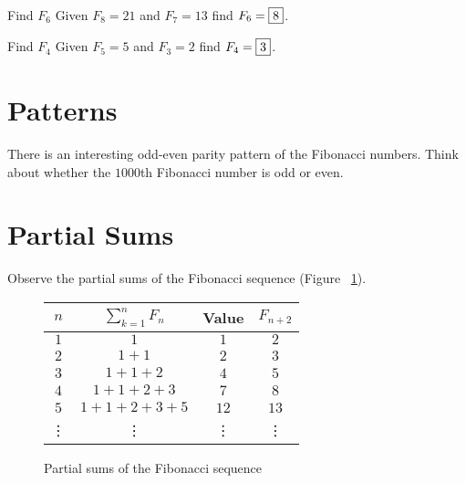 \documentclass[a4paper,10pt]{report}
\begin{document}
\begin{problem}{Find $F_6$}
 Given $F_8=21$ and $F_7=13$ find $F_6=\Ans{8}$.
\end{problem}

\begin{problem}{Find $F_4$}
 Given $F_5=5$ and $F_3=2$ find $F_4=\Ans{3}$.
\end{problem}

\section{Patterns}

There is an interesting odd-even parity pattern of the Fibonacci numbers. Think
about whether the $1000$th Fibonacci number is odd or even.

\section{Partial Sums}

Observe the partial sums of the Fibonacci sequence (Figure
~\ref{fib:partialsums}).

\begin{figure}
 \begin{tabular}{|c|c|c|c|}
  \hline
  $n$ & $\displaystyle \sum_{k=1}^n F_n$ & Value & $F_{n+2}$ \\
  \hline
  $1$ & $1$ & $1$ & $2$ \\
  $2$ & $1+1$ & $2$ & $3$ \\
  $3$ & $1+1+2$ & $4$ & $5$ \\
  $4$ & $1+1+2+3$ & $7$ & $8$ \\
  $5$ & $1+1+2+3+5$ & $12$ & $13$ \\
  \vdots & \vdots & \vdots & \vdots \\
  \hline
 \end{tabular}

 \caption{Partial sums of the Fibonacci sequence}

 \label{fib:partialsums}
\end{figure}

\printglossaries

\cleardoublepage
{}
\listoffigures
\end{document}
